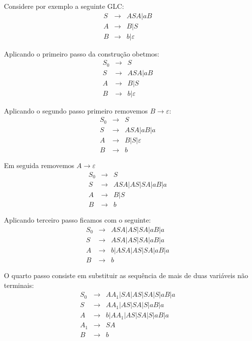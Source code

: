 \begin{example}
 Considere por exemplo a seguinte GLC:
  \begin{eqnarray*}
    S &\to& ASA | aB\\
    A &\to& B | S\\
    B &\to& b | \varepsilon
  \end{eqnarray*}

  Aplicando o primeiro passo da construção obetmos:
\begin{eqnarray*}
    S_0 &\to& S\\
    S &\to& ASA | aB\\
    A &\to& B | S\\
    B &\to& b | \varepsilon
  \end{eqnarray*}

  Aplicando o segundo passo primeiro removemos $B \to \varepsilon$:
  \begin{eqnarray*}
    S_0 &\to& S\\
    S &\to& ASA | aB | a\\
    A &\to& B | S | \varepsilon\\
    B &\to& b
  \end{eqnarray*}

  Em seguida removemos $A \to \varepsilon$
  \begin{eqnarray*}
    S_0 &\to& S\\
    S &\to& ASA | AS | SA | aB | a\\
    A &\to& B | S\\
    B &\to& b
  \end{eqnarray*}


  Aplicando terceiro passo ficamos com o seguinte:
  \begin{eqnarray*}
    S_0 &\to& ASA | AS | SA | aB | a\\
    S &\to& ASA | AS | SA | aB | a\\
    A &\to& b | ASA | AS | SA | aB | a\\
    B &\to& b
  \end{eqnarray*}

  O quarto passo consiste em substituir as sequência de mais de duas variáveis não terminais:
  \begin{eqnarray*}
    S_0 &\to& AA_1 | SA | AS | SA| S | aB | a\\
    S &\to& AA_1 | AS | SA| S | aB | a\\
    A &\to& b | AA_1 | AS | SA| S | aB | a\\
    A_1 &\to& SA\\
    B &\to& b
  \end{eqnarray*}


\end{example}
